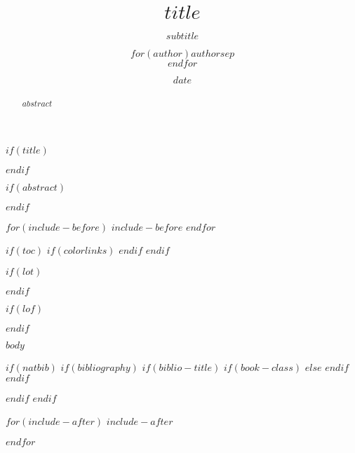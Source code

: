 \documentclass[english,10pt,a4paper,oneside]{book}
\title{$title$}
\title{}
\subtitle{\sf $subtitle$}
\author{$for(author)$$author$$sep$ \\ $endfor$}
\author{}
\date{$date$}
\date{}
\begin{document}
$if(title)$
\maketitle
$endif$

$if(abstract)$
\begin{abstract}
$abstract$
\end{abstract}
$endif$

$for(include-before)$
$include-before$
$endfor$

$if(toc)$
{
$if(colorlinks)$
\hypersetup{linkcolor=$if(toccolor)$$toccolor$$else$black$endif$}
$endif$
\setcounter{tocdepth}{$toc-depth$}
\tableofcontents
}
$endif$

$if(lot)$
\listoftables
$endif$

$if(lof)$
\listoffigures
$endif$

$body$

$if(natbib)$
$if(bibliography)$
$if(biblio-title)$
$if(book-class)$
\renewcommand\bibname{$biblio-title$}
$else$
\renewcommand\refname{$biblio-title$}
$endif$
$endif$

$endif$
$endif$

$for(include-after)$
$include-after$

$endfor$
\end{document}

